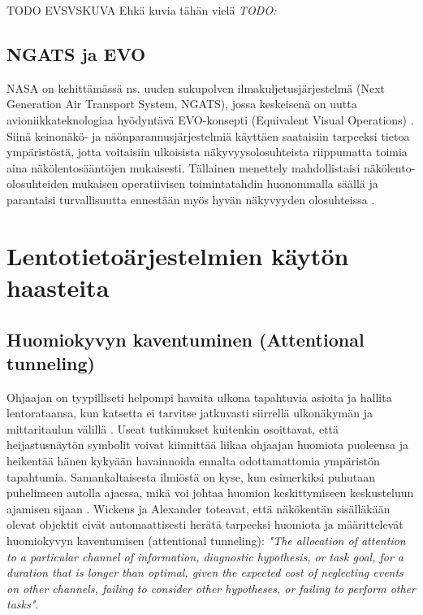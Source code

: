 \documentclass[utf8,bachelor,manualbib]{gradu3}
\begin{document}
TODO EVSVSKUVA Ehkä kuvia tähän vielä \citep{schnellym2004} \emph{TODO:}

\section{NGATS ja EVO}

NASA on kehittämässä ns. uuden sukupolven ilmakuljetusjärjestelmä (Next Generation Air Transport System, NGATS), jossa keskeisenä on uutta avioniikkateknologiaa hyödyntävä EVO-konsepti (Equivalent Visual Operations) \citep{baileyym2007}. Siinä keinonäkö- ja näönparannusjärjestelmiä käyttäen saataisiin tarpeeksi tietoa ympäristöstä, jotta voitaisiin ulkoisista näkyvyysolosuhteista riippumatta toimia aina näkölentosääntöjen mukaisesti. Tällainen menettely mahdollistaisi näkölento-olosuhteiden mukaisen operatiivisen toimintatahdin huonommalla säällä ja parantaisi turvallisuutta ennestään myös hyvän näkyvyyden olosuhteissa \citep{prinzel2013}.

\chapter{Lentotietoärjestelmien käytön haasteita}

\section{Huomiokyvyn kaventuminen (Attentional tunneling)}

Ohjaajan on tyypilliseti helpompi havaita ulkona tapahtuvia asioita ja hallita lentorataansa, kun katsetta ei tarvitse jatkuvasti siirrellä ulkonäkymän ja mittaritaulun välillä \citep{crawfordneal2006, ververswickens1998}. Useat tutkimukset \citep{fischerym1980, kimkaber2014, weintraubensing1992, wickenslong1995, wickensalexander2009} kuitenkin osoittavat, että heijastusnäytön symbolit voivat kiinnittää liikaa ohjaajan huomiota puoleensa ja heikentää hänen kykyään havainnoida ennalta odottamattomia ympäristön tapahtumia. Samankaltaisesta ilmiöstä on kyse, kun esimerkiksi puhutaan puhelimeen autolla ajaessa, mikä voi johtaa huomion keskittymiseen keskusteluun ajamisen sijaan \citep{horreywickens2006, strayerdrews2007, strayerym2001}. Wickens ja Alexander \citeyearpar{wickensalexander2009} toteavat, että näkökentän sisälläkään olevat objektit eivät automaattisesti herätä tarpeeksi huomiota ja määrittelevät huomiokyvyn kaventumisen (attentional tunneling): \emph{"The allocation of attention to a particular channel of information, diagnostic hypothesis, or task goal, for a duration that is longer than optimal, given the expected cost of neglecting events on other channels, failing to consider other hypotheses, or failing to perform other tasks"}.
\end{document}
